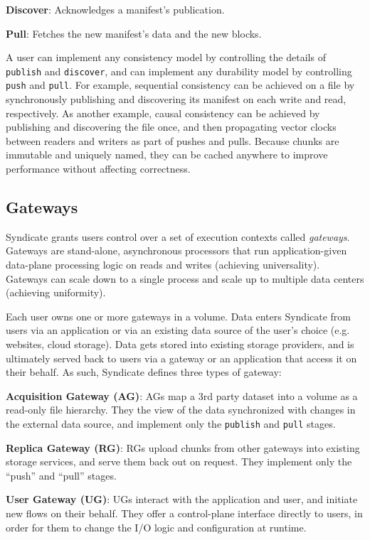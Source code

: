 \textbf{Discover}: Acknowledges a manifest's publication.

\textbf{Pull}: Fetches the new manifest's data and the new blocks.

A user can implement any consistency model by controlling the details of
\texttt{publish} and \texttt{discover}, and can implement any durability model
by controlling \texttt{push} and \texttt{pull}. For example, sequential
consistency can be achieved on a file by synchronously publishing and
discovering its manifest on each write and read, respectively. As another
example, causal consistency can be achieved by publishing and discovering the
file once, and then propagating vector clocks between readers and writers as
part of pushes and pulls. Because chunks are immutable and uniquely named, they
can be cached anywhere to improve performance without affecting correctness.

\subsection{Gateways}

Syndicate grants users control over a set of execution contexts called
\textit{gateways}. Gateways are stand-alone,
asynchronous processors that run application-given data-plane processing logic
on reads and writes (achieving universality). Gateways can scale down to a
single process and scale up to multiple data centers (achieving uniformity).

Each user owns one or more gateways in a volume. Data enters Syndicate from
users via an application or via an existing data source of the user's choice
(e.g. websites, cloud storage). Data gets stored into existing storage
providers, and is ultimately served back to users via a gateway or an
application that access it on their behalf. As such, Syndicate defines three
types of gateway:

\textbf{Acquisition Gateway (AG)}: AGs map a 3rd party dataset into a volume as a read-only
file hierarchy.  They the view of the data synchronized with changes in the
external data source, and implement only the \texttt{publish} and \texttt{pull}
stages.

\textbf{Replica Gateway (RG)}:   RGs upload chunks from other gateways into existing
storage services, and serve them back out on request. They implement only the
``push'' and ``pull'' stages.

\textbf{User Gateway (UG)}: UGs interact with the
application and user, and initiate new flows on their behalf. They offer a control-plane interface directly to
users, in order for them to change the I/O logic and configuration at runtime.

